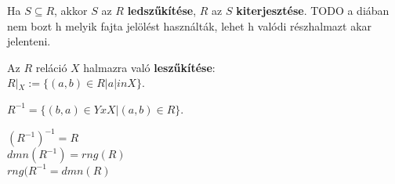 \documentclass{beamer}
\begin{document}
\begin{frame}
\begin{tcolorbox}[title={Def.: Leszűkítés, kierjesztés}]
Ha $S \subseteq R$, akkor $S$ az $R$ \textbf{ledszűkítése}, $R$ az $S$ \textbf{kiterjesztése}.
TODO a diában nem bozt h melyik fajta jelölést használták, lehet h valódi részhalmazt akar jelenteni.
\end{tcolorbox}

\begin{tcolorbox}[title={Def.: Az $R$ reláció $X$ halmazra való Leszűkítése}]
Az $R$ reláció $X$ halmazra való \textbf{leszűkítése}:\\
$R|_X := \{(a, b) \in R | a |in X \}$.
\end{tcolorbox}

\begin{tcolorbox}[title={Def.: Ar $r \subset X x Y$ reláció inverze}]
$R^{-1} = \{(b, a) \in Y x X | (a, b) \in R \}$.
\end{tcolorbox}

\begin{tcolorbox}[title={Ész}]
$(R^{-1})^{-1} = R$\\
$dmn(R^{-1}) = rng(R)$\\
$rng(R^{-1} = dmn(R)$\\
\end{tcolorbox}
\end{frame}
\end{document}
